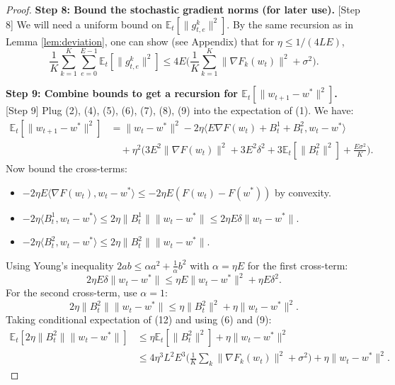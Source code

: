 \documentclass{article}
\begin{document}
\begin{proof}
\noindent \textbf{Step 8: Bound the stochastic gradient norms (for later use).} [Step 8]
We will need a uniform bound on $\mathbb{E}_t[\|g_{t,e}^k\|^2]$. By the same recursion as in Lemma \ref{lem:deviation}, one can show (see Appendix) that for $\eta \le 1/(4LE)$,
\begin{equation}
\frac{1}{K}\sum_{k=1}^K \sum_{e=0}^{E-1} \mathbb{E}_t[\|g_{t,e}^k\|^2] \le 4E \Big( \frac{1}{K}\sum_{k=1}^K \|\nabla F_k(w_t)\|^2 + \sigma^2 \Big). \tag{10}
\end{equation}

\noindent \textbf{Step 9: Combine bounds to get a recursion for $\mathbb{E}_t[\|w_{t+1} - w^*\|^2]$.} [Step 9]
Plug (2), (4), (5), (6), (7), (8), (9) into the expectation of (1). We have:
\begin{align}
\mathbb{E}_t[\|w_{t+1} - w^*\|^2] &= \|w_t - w^*\|^2 - 2\eta \Big\langle E \nabla F(w_t) + B_t^1 + B_t^2, w_t - w^* \Big\rangle \\
&\quad + \eta^2 \Big( 3E^2 \|\nabla F(w_t)\|^2 + 3E^2\delta^2 + 3\mathbb{E}_t[\|B_t^2\|^2] + \frac{E\sigma^2}{K} \Big).
\end{align}
Now bound the cross-terms:
\begin{itemize}
    \item $-2\eta E \langle \nabla F(w_t), w_t - w^* \rangle \le -2\eta E (F(w_t) - F(w^*))$ by convexity.
    \item $-2\eta \langle B_t^1, w_t - w^* \rangle \le 2\eta \|B_t^1\| \|w_t - w^*\| \le 2\eta E \delta \|w_t - w^*\|$.
    \item $-2\eta \langle B_t^2, w_t - w^* \rangle \le 2\eta \|B_t^2\| \|w_t - w^*\|$.
\end{itemize}
Using Young's inequality $2ab \le \alpha a^2 + \frac{1}{\alpha}b^2$ with $\alpha = \eta E$ for the first cross-term:
\begin{equation}
2\eta E \delta \|w_t - w^*\| \le \eta E \|w_t - w^*\|^2 + \eta E \delta^2. \tag{11}
\end{equation}
For the second cross-term, use $\alpha = 1$:
\begin{equation}
2\eta \|B_t^2\| \|w_t - w^*\| \le \eta \|B_t^2\|^2 + \eta \|w_t - w^*\|^2. \tag{12}
\end{equation}
Taking conditional expectation of (12) and using (6) and (9):
\begin{align}
\mathbb{E}_t[2\eta \|B_t^2\| \|w_t - w^*\|] &\le \eta \mathbb{E}_t[\|B_t^2\|^2] + \eta \|w_t - w^*\|^2 \\
&\le 4\eta^3 L^2 E^3 \Big( \frac{1}{K}\sum_{k} \|\nabla F_k(w_t)\|^2 + \sigma^2 \Big) + \eta \|w_t - w^*\|^2. \tag{13}

\end{align}
\end{proof}
\end{document}
